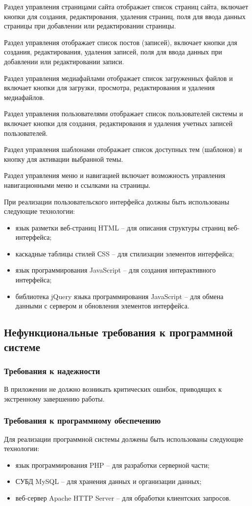 Раздел управления страницами сайта отображает список страниц сайта, включает кнопки для создания, редактирования, удаления страниц, поля для ввода данных страницы при добавлении или редактировании страницы.

Раздел управления отображает список постов (записей), включает кнопки для создания, редактирования, удаления записей, поля для ввода данных при добавлении или редактировании записи.

Раздел управления медиафайлами отображает список загруженных файлов и включает кнопки для загрузки, просмотра, редактирования и удаления медиафайлов.

Раздел управления пользователями отображает список пользователей системы и включает кнопки для создания, редактирования и удаления учетных записей пользователей.

Раздел управления шаблонами отображает список доступных тем (шаблонов) и кнопку для активации выбранной темы.

Раздел управления меню и навигацией включает возможность управления навигационными меню и ссылками на страницы.

При реализации пользовательского интерфейса должны быть использованы следующие технологии:
\begin{itemize}
	\item язык разметки веб-страниц HTML -- для описания структуры страниц веб-интерфейса;
	\item каскадные таблицы стилей СSS -- для стилизации элементов интерфейса;
	\item язык программирования JavaScript -- для создания интерактивного интерфейса;
	\item библиотека jQuery языка программирования JavaScript -- для обмена данными с сервером и обновления элементов интерфейса.
\end{itemize}

\subsection{Нефункциональные требования к программной системе}

\subsubsection{Требования к надежности}
В приложении не должно возникать критических ошибок, приводящих к экстренному завершению работы.

\subsubsection{Требования к программному обеспечению}
Для реализации программной системы должены быть использованы следующие технологии:
\begin{itemize}
	\item язык программирования PHP -- для разработки серверной части;
	\item СУБД MySQL -- для хранения данных и организации данных;
	\item веб-сервер Apache HTTP Server -- для обработки клиентских запросов.
\end{itemize}

